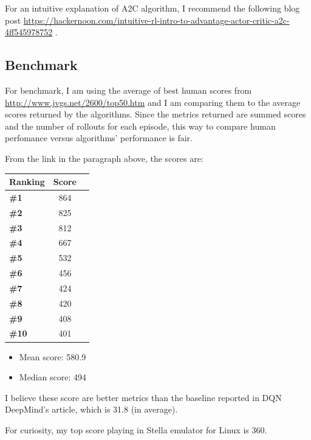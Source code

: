 \documentclass[11pt,twoside,a4paper]{article}
\begin{document}
For an intuitive explanation of A2C algorithm, I recommend the following blog
post \url{https://hackernoon.com/intuitive-rl-intro-to-advantage-actor-critic-a2c-4ff545978752}
\cite{intuitive_a2c}.

\subsection*{Benchmark}

For benchmark, I am using the average of best human scores from
\url{http://www.jvgs.net/2600/top50.htm} and I am comparing them to the average
scores returned by the algorithms. Since the metrics returned are summed scores
and the number of rollouts for each episode, this way to compare human
perfomance versus algorithms' performance is fair.

From the link in the paragraph above, the scores are:

\begin{center}
  \begin{tabular}{ | l | c | r | }
    \hline
    \textbf{Ranking} & \textbf{Score} \\ \hline
    \textbf{\#1} & 864 \\ \hline
    \textbf{\#2} & 825 \\ \hline
    \textbf{\#3} & 812 \\ \hline
    \textbf{\#4} & 667 \\ \hline
    \textbf{\#5} & 532 \\ \hline
    \textbf{\#6} & 456 \\ \hline
    \textbf{\#7} & 424 \\ \hline
    \textbf{\#8} & 420 \\ \hline
    \textbf{\#9} & 408 \\ \hline
    \textbf{\#10} & 401 \\
    \hline
  \end{tabular}
\end{center}

\begin{itemize}
  \item Mean score: 580.9
  \item Median score: 494
\end{itemize}

I believe these score are better metrics than the baseline reported in DQN
DeepMind's article\cite{mnih2015humanlevel}, which is 31.8 (in average).

For curiosity, my top score playing in Stella emulator for Linux is 360.
\end{document}
